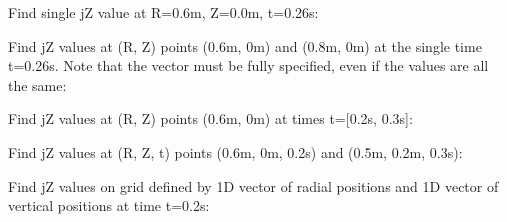 \documentclass[letterpaper,10pt,english]{sphinxmanual}
\begin{document}
\begin{fulllineitems}
\begin{fulllineitems}
Find single jZ value at R=0.6m, Z=0.0m, t=0.26s:

\begin{sphinxVerbatim}[commandchars=\\\{\}]
    
\end{sphinxVerbatim}

Find jZ values at (R, Z) points (0.6m, 0m) and (0.8m, 0m) at the
single time t=0.26s. Note that the  vector must be fully
specified, even if the values are all the same:

\begin{sphinxVerbatim}[commandchars=\\\{\}]
  \PYG{p}{[} \PYG{p}{]} \PYG{p}{[} \PYG{p}{]} 
\end{sphinxVerbatim}

Find jZ values at (R, Z) points (0.6m, 0m) at times t={[}0.2s, 0.3s{]}:

\begin{sphinxVerbatim}[commandchars=\\\{\}]
    \PYG{p}{[} \PYG{p}{]}
\end{sphinxVerbatim}

Find jZ values at (R, Z, t) points (0.6m, 0m, 0.2s) and
(0.5m, 0.2m, 0.3s):

\begin{sphinxVerbatim}[commandchars=\\\{\}]
  \PYG{p}{[} \PYG{p}{]} \PYG{p}{[} \PYG{p}{]} \PYG{p}{[} \PYG{p}{]} 
\end{sphinxVerbatim}

Find jZ values on grid defined by 1D vector of radial positions 
and 1D vector of vertical positions  at time t=0.2s:


\end{fulllineitems}
\end{fulllineitems}
\end{document}
